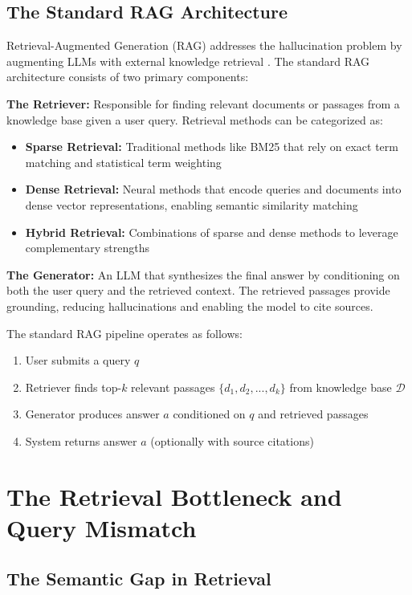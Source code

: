 \subsection{The Standard RAG Architecture}

Retrieval-Augmented Generation (RAG) addresses the hallucination problem by augmenting LLMs with external knowledge retrieval \cite{lewis_2021_retrievalaugmented}. The standard RAG architecture consists of two primary components:

\textbf{The Retriever:} Responsible for finding relevant documents or passages from a knowledge base given a user query. Retrieval methods can be categorized as:
\begin{itemize}
    \item \textbf{Sparse Retrieval:} Traditional methods like BM25 that rely on exact term matching and statistical term weighting
    \item \textbf{Dense Retrieval:} Neural methods that encode queries and documents into dense vector representations, enabling semantic similarity matching \cite{karpukhin_2020_dense}
    \item \textbf{Hybrid Retrieval:} Combinations of sparse and dense methods to leverage complementary strengths
\end{itemize}

\textbf{The Generator:} An LLM that synthesizes the final answer by conditioning on both the user query and the retrieved context. The retrieved passages provide grounding, reducing hallucinations and enabling the model to cite sources.

The standard RAG pipeline operates as follows:
\begin{enumerate}
    \item User submits a query $q$
    \item Retriever finds top-$k$ relevant passages $\{d_1, d_2, ..., d_k\}$ from knowledge base $\mathcal{D}$
    \item Generator produces answer $a$ conditioned on $q$ and retrieved passages
    \item System returns answer $a$ (optionally with source citations)
\end{enumerate}

\section{The Retrieval Bottleneck and Query Mismatch}

\subsection{The Semantic Gap in Retrieval}

